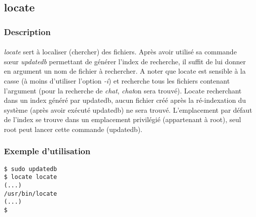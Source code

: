 \subsection*{locate}
\subsubsection*{Description}

\paragraph{}
\emph{locate} sert à localiser (chercher) des fichiers. Après avoir utilisé sa
commande sœur \emph{updatedb} permettant de générer l'index de recherche, il
suffit de lui donner en argument un nom de fichier à rechercher.  A noter que
locate est sensible à la casse (à moins d'utiliser l'option \emph{-i}) et
recherche tous les fichiers contenant l'argument (pour la recherche de
\emph{chat}, \emph{chat}on sera trouvé).  Locate recherchant dans un index
généré par updatedb, aucun fichier créé après la ré-indexation du système
(après avoir exécuté updatedb) ne sera trouvé. L'emplacement par défaut de
l'index se trouve dans un emplacement privilégié (appartenant à root), seul
root peut lancer cette commande (updatedb).

\subsubsection*{Exemple d'utilisation}

\begin{lstlisting}
$ sudo updatedb
$ locate locate
(...)
/usr/bin/locate
(...)
$
\end{lstlisting}
